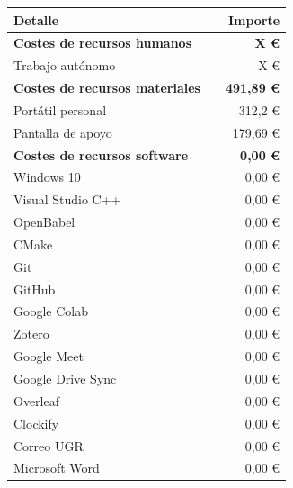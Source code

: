 \begin{longtable}[c]{lm{2cm}r}
\toprule
\textbf{Detalle}                        && \textbf{Importe} \\
\endfirsthead
%
\endhead
%
\endfoot
%
\endlastfoot
%
\midrule
\textbf{Costes de recursos humanos}     && \textbf{X €} \\
Trabajo autónomo                        && X €          \\
\midrule
\textbf{Costes de recursos materiales}  && \textbf{491,89 €} \\
Portátil personal                       && 312,2 €            \\ %
Pantalla de apoyo                       && 179,69 €             \\ 
\midrule
\textbf{Costes de recursos software}    && \textbf{0,00 €}    \\
Windows 10                              && 0,00 €             \\
Visual Studio C++                       && 0,00 €             \\
OpenBabel                               && 0,00 €             \\
CMake                                   && 0,00 €             \\
Git                                     && 0,00 €             \\
GitHub                                  && 0,00 €             \\
Google Colab                            && 0,00 €             \\
Zotero                                  && 0,00 €             \\
Google Meet                             && 0,00 €             \\
Google Drive Sync                       && 0,00 €             \\
Overleaf                                && 0,00 €             \\
Clockify                                && 0,00 €             \\
Correo UGR                              && 0,00 €             \\
Microsoft Word                          && 0,00 €             \\

\end{longtable}
